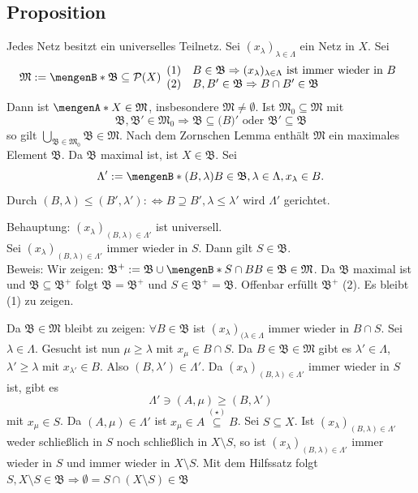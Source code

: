 \subsection[Proposition: Jedes Netzt besitzt universelles Teilnetz]{Proposition} %
\label{sub:412}
Jedes Netz besitzt ein universelles Teilnetz.
Sei $(x_\lambda )_{\lambda  \in \Lambda}$ ein Netz in $X$. Sei 
\[
	\mathfrak{M} := \set[\mathfrak{B} \subseteq \mathcal{P}(X) ]{
	\begin{array}{ll}
		(1) & B \in \mathfrak{B} \Rightarrow (x_\lambda )_{\lambda  \in \Lambda} \text{ ist immer wieder in } B \\
		(2) & B, B' \in \mathfrak{B} \Rightarrow B \cap B' \in \mathfrak{B}
	\end{array}
	} 
\]
Dann ist $\set{X} \in \mathfrak{M}$, insbesondere $\mathfrak{M} \not= \emptyset$. Ist $\mathfrak{M}_0 \subseteq \mathfrak{M}$ mit 
\[
	\mathfrak{B}, \mathfrak{B}' \in \mathfrak{M}_0 \Rightarrow \mathfrak{B} \subseteq \mathfrak(B)' \text{ oder } \mathfrak{B'} \subseteq \mathfrak{B}
\]
so gilt $\bigcup_{\mathfrak{B \in \mathfrak{M}_0}} \mathfrak{B} \in \mathfrak{M}$. Nach dem Zornschen Lemma enthält $\mathfrak{M}$ ein maximales Element $\mathfrak{B}$.
Da $\mathfrak{B}$ maximal ist, ist $X \in \mathfrak{B}$. Sei 
\[
	\Lambda' := \set[(B,\lambda )]{B \in \mathfrak{B}, \lambda \in \Lambda, x_\lambda  \in B}. 
\]
Durch $(B,\lambda ) \le (B', \lambda ') :\Leftrightarrow B \supseteq B', \lambda  \le \lambda '$ wird $\Lambda'$ gerichtet.

Behauptung: $(x_\lambda )_{(B,\lambda)  \in \Lambda'}$ ist universell. \\
Sei $(x_\lambda )_{(B,\lambda)  \in \Lambda'}$ immer wieder in $S$. Dann gilt $S \in \mathfrak{B}$. \\
Beweis: Wir zeigen: $\mathfrak{B}^+ := \mathfrak{B} \cup \set[S \cap B]{B \in \mathfrak{B}}  \in \mathfrak{M}$. Da $\mathfrak{B}$ maximal ist und 
$\mathfrak{B} \subseteq \mathfrak{B}^+$ folgt $\mathfrak{B} = \mathfrak{B}^+$ und $S \in \mathfrak{B}^+ =\mathfrak{B}$. 
Offenbar erfüllt $\mathfrak{B}^+$ (2). Es bleibt (1) zu zeigen.

Da $\mathfrak{B} \in \mathfrak{M}$ bleibt zu zeigen: $\forall B \in \mathfrak{B}$ ist $(x_\lambda )_{(\lambda \in \Lambda}$ immer wieder in $B \cap S$. Sei 
$\lambda \in \Lambda$. Gesucht ist nun $\mu \ge \lambda $ mit $x_\mu \in B \cap S$. Da $B \in \mathfrak{B} \in \mathfrak{M}$ gibt es $\lambda ' \in \Lambda$, 
$\lambda ' \ge \lambda $ mit $x_{\lambda'} \in B$. Also $(B, \lambda') \in \Lambda'$. Da $(x_\lambda )_{(B,\lambda)  \in \Lambda'}$ immer wieder in $S$ ist, gibt es
\[
	\Lambda' \ni (A, \mu) \ge (B,\lambda ') \tag{$\star$}
\]
mit $x_{\mu} \in S$. Da $(A,\mu) \in \Lambda'$ ist $x_\mu \in A \stackrel{(\star)}{\subseteq} B$. Sei $S \subseteq X$. Ist $(x_\lambda )_{(B,\lambda)  \in \Lambda'}$
weder schließlich in $S$ noch schließlich in $X \setminus S$, so ist $(x_\lambda )_{(B,\lambda)  \in \Lambda'}$ immer wieder in $S$ und immer wieder in $X \setminus S$.
Mit dem Hilfssatz folgt $S, X \setminus S \in \mathfrak{B} \Rightarrow \emptyset = S \cap (X \setminus S) \in \mathfrak{B}$ \light \bewende


